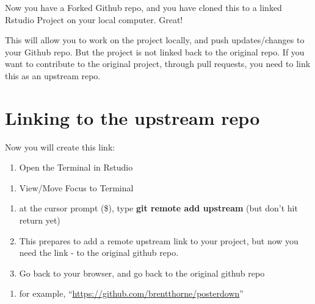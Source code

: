 \documentclass[
]{book}
\providecommand{\tightlist}{%
  \setlength{\itemsep}{0pt}\setlength{\parskip}{0pt}}
\begin{document}
Now you have a Forked Github repo, and you have cloned this to a linked Rstudio Project on your local computer. Great!

This will allow you to work on the project locally, and push updates/changes to your Github repo. But the project is not linked back to the original repo. If you want to contribute to the original project, through pull requests, you need to link this as an upstream repo.

\hypertarget{linking-to-the-upstream-repo}{%
\section{Linking to the upstream repo}\label{linking-to-the-upstream-repo}}

Now you will create this link:

\begin{enumerate}
\def\labelenumi{\arabic{enumi}.}
\tightlist
\item
  Open the Terminal in Rstudio
\end{enumerate}

\begin{enumerate}
\def\labelenumi{\roman{enumi})}
\tightlist
\item
  View/Move Focus to Terminal
\end{enumerate}

\begin{enumerate}
\def\labelenumi{\arabic{enumi}.}
\setcounter{enumi}{1}
\tightlist
\item
  at the cursor prompt (\$), type \textbf{git remote add upstream} (but don't hit return yet)
\item
  This prepares to add a remote upstream link to your project, but now you need the link - to the original github repo.
\item
  Go back to your browser, and go back to the original github repo
\end{enumerate}

\begin{enumerate}
\def\labelenumi{\roman{enumi})}
\tightlist
\item
  for example, ``\url{https://github.com/brentthorne/posterdown}''
\end{enumerate}
\end{document}

